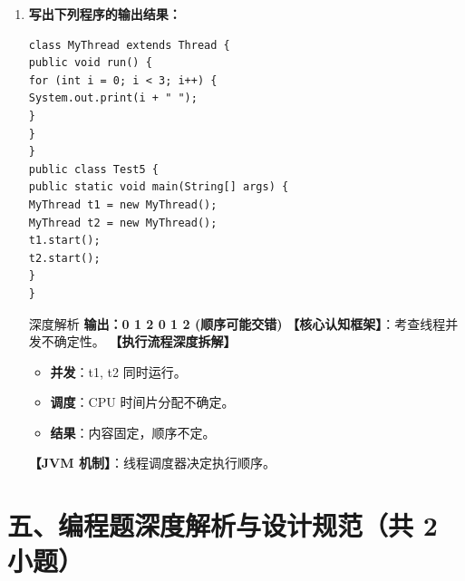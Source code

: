 ﻿\documentclass[12pt, a4paper]{ctexart}
\begin{document}
\begin{enumerate}[label=\textbf{\arabic*.}, itemsep=1em]
	\item \textbf{写出下列程序的输出结果：}
	      \begin{lstlisting}[style=JavaExam]
class MyThread extends Thread {
public void run() {
for (int i = 0; i < 3; i++) {
System.out.print(i + " ");
}
}
}
public class Test5 {
public static void main(String[] args) {
MyThread t1 = new MyThread();
MyThread t2 = new MyThread();
t1.start();
t2.start();
}
}
    \end{lstlisting}
	      \begin{bluebox}{深度解析}
		      \textbf{输出：0 1 2 0 1 2  (顺序可能交错)}
		      \textbf{【核心认知框架】}：考查线程并发不确定性。
		      \textbf{【执行流程深度拆解】}
		      \begin{itemize}[leftmargin=*, nosep]
			      \item \textbf{并发}：t1, t2 同时运行。
			      \item \textbf{调度}：CPU 时间片分配不确定。
			      \item \textbf{结果}：内容固定，顺序不定。
		      \end{itemize}
		      \textbf{【JVM 机制】}：线程调度器决定执行顺序。
	      \end{bluebox}
\end{enumerate}

\section*{五、编程题深度解析与设计规范（共 2 小题）}
\end{document}
